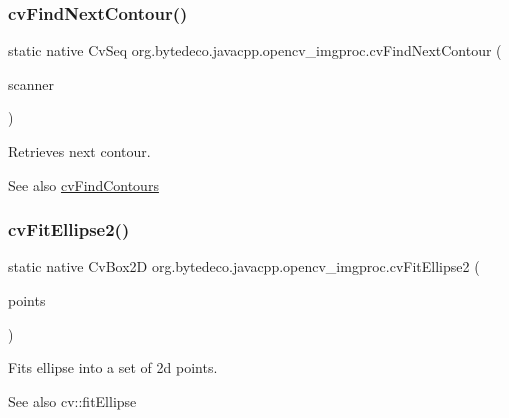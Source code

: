 \subsubsection{\texorpdfstring{cv\+Find\+Next\+Contour()}{cvFindNextContour()}}
{\footnotesize\ttfamily static native Cv\+Seq org.\+bytedeco.\+javacpp.\+opencv\+\_\+imgproc.\+cv\+Find\+Next\+Contour (\begin{DoxyParamCaption}\item[{Cv\+Contour\+Scanner}]{scanner }\end{DoxyParamCaption})\hspace{0.3cm}{\ttfamily [static]}}



Retrieves next contour. 

\begin{DoxySeeAlso}{See also}
\hyperlink{group__imgproc__c_gaa4cfb26bdebe22cd9a83d79b429520ee}{cv\+Find\+Contours} 
\end{DoxySeeAlso}
\mbox{\label{group__imgproc__c_ga417295a4b5e1071f6af64972132cecac}} 
\subsubsection{\texorpdfstring{cv\+Fit\+Ellipse2()}{cvFitEllipse2()}}
{\footnotesize\ttfamily static native Cv\+Box2D org.\+bytedeco.\+javacpp.\+opencv\+\_\+imgproc.\+cv\+Fit\+Ellipse2 (\begin{DoxyParamCaption}\item[{@Const Cv\+Arr}]{points }\end{DoxyParamCaption})\hspace{0.3cm}{\ttfamily [static]}}



Fits ellipse into a set of 2d points. 

\begin{DoxySeeAlso}{See also}
cv\+::fit\+Ellipse 
\end{DoxySeeAlso}
\mbox{\label{group__imgproc__c_ga2362098648e7207ce5c609585841cc9d}} 

